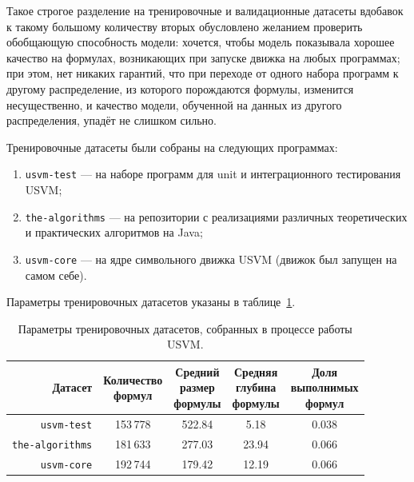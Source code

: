 Такое строгое разделение на тренировочные и валидационные датасеты вдобавок к такому большому количеству вторых обусловлено желанием проверить обобщающую способность модели: хочется, чтобы модель показывала хорошее качество на формулах, возникающих при запуске движка на любых программах; при этом, нет никаких гарантий, что при переходе от одного набора программ к другому распределение, из которого порождаются формулы, изменится несущественно, и качество модели, обученной на данных из другого распределения, упадёт не слишком сильно.

Тренировочные датасеты были собраны на следующих программах:

\begin{enumerate}
    \item \texttt{usvm-test} --- на наборе программ для unit и интеграционного тестирования USVM;
    \item \texttt{the-algorithms} --- на репозитории с реализациями различных теоретических и практических алгоритмов на Java;
    \item \texttt{usvm-core} --- на ядре символьного движка USVM (движок был запущен на самом себе).
\end{enumerate}

Параметры тренировочных датасетов указаны в таблице~\ref{usvm-train-datasets-table}.

\begin{table}[ht]
\begin{center}
\begin{tabular}{r|cccc}
    Датасет & \makecell{Количество \\ формул} & \makecell{Средний \\ размер \\ формулы} & \makecell{Средняя \\ глубина \\ формулы} & \makecell{Доля \\ выполнимых \\ формул} \\
    \hline \hline
    \rule{0pt}{2.5ex}
    \texttt{usvm-test} & 153\,778 & 522.84 & 5.18 & 0.038 \\
    \texttt{the-algorithms} & 181\,633 & 277.03 & 23.94 & 0.066 \\
    \texttt{usvm-core} & 192\,744 & 179.42 & 12.19 & 0.066 \\
\end{tabular}
\caption{\label{usvm-train-datasets-table} Параметры тренировочных датасетов, собранных в процессе работы USVM.}
\end{center}
\end{table}

